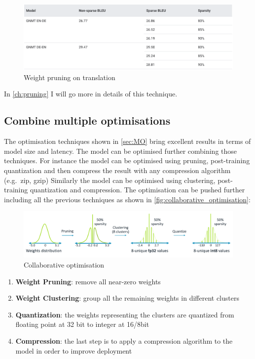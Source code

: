 \begin{figure}[ht]
    \includegraphics[width=\textwidth]{images/introduction/pruning_translation.png}
    \centering
    \caption{Weight pruning on translation}\label{fig:pruning_translation}
\end{figure}

In \autoref{ch:pruning} I will go more in details of this technique.

\subsection{Combine multiple optimisations}
The optimisation techniques shown in \autoref{sec:MO} bring excellent results
in terms of model size and latency.
The model can be optimised further combining those techniques. For instance the
model can be optimised using pruning, post-training quantization and then
compress the result with any compression algorithm (e.g.\ zip, gzip)
Similarly the model can be optimised using clustering, post-training
quantization and compression.
The optimisation can be pushed further including all the previous techniques as
shown in \autoref{fig:collaborative_optimisation}:

\begin{figure}[ht]
    \includegraphics[width=\textwidth]{images/introduction/collaborative_optimisation.png}
    \centering
    \caption{Collaborative optimisation}\label{fig:collaborative_optimisation}
\end{figure}

\begin{enumerate}
    \item \textbf{Weight Pruning}: remove all near-zero weights
    \item \textbf{Weight Clustering}: group all the remaining weights in
        different clusters
    \item \textbf{Quantization}: the weights representing the clusters are
        quantized from floating point at 32 bit to integer at 16/8bit
    \item \textbf{Compression}: the last step is to apply a compression
        algorithm to the model in order to improve deployment
\end{enumerate}

